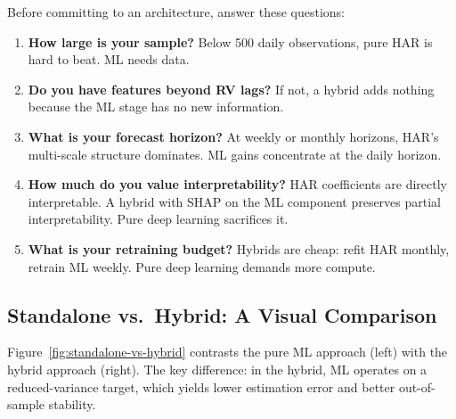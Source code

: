 Before committing to an architecture, answer these questions:

\begin{enumerate}
  \item \textbf{How large is your sample?}  Below 500 daily observations,
        pure HAR is hard to beat.  ML needs data.
  \item \textbf{Do you have features beyond RV lags?}  If not, a hybrid
        adds nothing because the ML stage has no new information.
  \item \textbf{What is your forecast horizon?}  At weekly or monthly
        horizons, HAR's multi-scale structure dominates.  ML gains
        concentrate at the daily horizon.
  \item \textbf{How much do you value interpretability?}  HAR coefficients
        are directly interpretable.  A hybrid with SHAP on the ML
        component preserves partial interpretability.  Pure deep learning
        sacrifices it.
  \item \textbf{What is your retraining budget?}  Hybrids are cheap:
        refit HAR monthly, retrain ML weekly.  Pure deep learning demands
        more compute.
\end{enumerate}


\subsection{Standalone vs.\ Hybrid: A Visual Comparison}

Figure~\ref{fig:standalone-vs-hybrid} contrasts the pure ML approach
(left) with the hybrid approach (right).  The key difference: in the
hybrid, ML operates on a reduced-variance target, which yields lower
estimation error and better out-of-sample stability.

